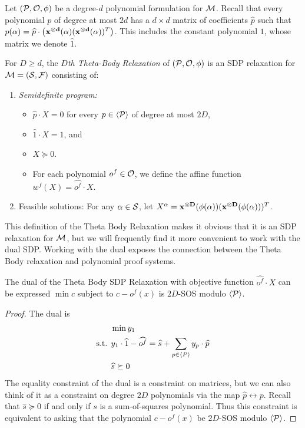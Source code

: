 Let $(\mathcal P, \mathcal O, \phi)$ be a degree-$d$ polynomial formulation for $\mathcal M$. Recall that every polynomial $p$ of degree at most $2d$ has a $d \times d$ matrix of coefficients $\widehat{p}$ such that $p(\alpha) = \widehat{p} \cdot \left(\mathbf{x^{\otimes d}}(\alpha)(\mathbf{x^{\otimes d}}(\alpha))^T\right)$. This includes the constant polynomial $1$, whose matrix we denote $\hat{1}$.
\begin{definition}
For $D \geq d$, the \emph{$D$th Theta-Body Relaxation} of $(\mathcal P,\mathcal O, \phi)$ is an SDP relaxation for $\mathcal M = (\mathcal S, \mathcal F)$ consisting of:
\begin{enumerate}
    \item \emph{Semidefinite program:} 
		\begin{itemize}
		\item $\widehat{p} \cdot X = 0$ for every $p \in \langle \mathcal P \rangle$ of degree at most $2D$, 
		\item $\widehat{1} \cdot X = 1$, and 
		\item $X \succeq 0$. 
		\item For each polynomial $o^f \in \mathcal O$, we define the affine function $w^f(X) = \widehat{o^f} \cdot X$.
		\end{itemize}
\item Feasible solutions: For any $\alpha \in \mathcal S$, let $X^\alpha = \mathbf{x^{\otimes D}}(\phi(\alpha))(\mathbf{x^{\otimes D}}(\phi(\alpha)))^T$.
\end{enumerate}
\end{definition}
This definition of the Theta Body Relaxation makes it obvious that it is an SDP relaxation for $\mathcal M$, but we will frequently find it more convenient to work with the dual SDP. Working with the dual exposes the connection between the Theta Body relaxation and polynomial proof systems.
\begin{lemma}
The dual of the Theta Body SDP Relaxation with objective function $\widehat{o^f} \cdot X$ can be expressed $\min c$ subject to $c - o^f(x)$ is $2D$-SOS modulo $\langle \mathcal P \rangle$.
\end{lemma}
\begin{proof}
The dual is
\begin{align*}
&\min y_1 \\
\text{s.t. }&y_1 \cdot \widehat{1} - \widehat{o^f} = \widehat{s} + \sum_{p \in \langle P \rangle} y_p \cdot \widehat{p} \\
&\widehat{s} \succeq 0
\end{align*}
    The equality constraint of the dual is a constraint on matrices, but we can also think of it as a constraint on degree $2D$ polynomials via the map $\widehat{p} \leftrightarrow p$. Recall that $\widehat{s} \succeq 0$ if and only if $s$ is a sum-of-squares polynomial. Thus this constraint is equivalent to asking that the polynomial $c - o^f(x)$ be $2D$-SOS modulo $\langle \mathcal P \rangle$.
\end{proof}

